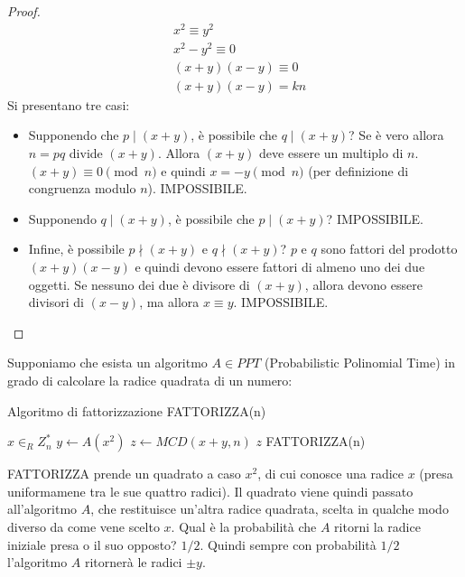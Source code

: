\begin{proof}
\begin{align*}
    &x^2 \equiv y^2\\
    &x^2 - y^2 \equiv 0\\
    &(x+y)(x-y) \equiv 0\\
    &(x+y)(x-y) = kn
\end{align*}
\noindent Si presentano tre casi:
\begin{itemize}
    \item Supponendo che $p \mid(x+y)$, è possibile che $q \mid(x+y)$? Se è vero allora $n = pq$ divide $(x+y)$. Allora $(x+y)$ deve essere un multiplo di $n$. $(x+y) \equiv 0 \pmod n$ e quindi $x = -y \pmod n$ (per definizione di congruenza modulo $n$). IMPOSSIBILE.

   \item Supponendo $q \mid(x+y)$, è possibile che $p \mid(x+y)$? IMPOSSIBILE.

   \item  Infine, è possibile $p \nmid(x+y)$ e $q \nmid(x+y)$? $p$ e $q$ sono fattori del prodotto $(x+y)(x-y)$ e quindi devono essere fattori di almeno uno dei due oggetti. Se nessuno dei due è divisore di $(x+y)$, allora devono essere divisori di $(x-y)$, ma allora $x \equiv y$. IMPOSSIBILE.
\end{itemize}
\end{proof}

\noindent Supponiamo che esista un algoritmo $A \in PPT$ (Probabilistic Polinomial Time) in grado di calcolare la radice quadrata di un numero:

\begin{algorithm}[H]
\caption{Algoritmo di fattorizzazione FATTORIZZA(n)}\label{alg:cap}
\begin{algorithmic}
\State $x \in_R Z_n^*$
\State $y \gets A(x^2)$
\State $z \gets MCD(x+y, n)$
    \State \Return $z$
\Else
    \State \Return FATTORIZZA(n)
\EndIf
\end{algorithmic}
\end{algorithm}

\noindent FATTORIZZA prende un quadrato a caso $x^2$, di cui conosce una radice $x$ (presa uniformamene tra le sue quattro radici). Il quadrato viene quindi passato all'algoritmo $A$, che restituisce un'altra radice quadrata, scelta in qualche modo diverso da come vene scelto $x$. Qual è la probabilità che $A$ ritorni la radice iniziale presa o il suo opposto? $1 / 2$. Quindi sempre con probabilità $1 / 2$ l'algoritmo $A$ ritornerà le radici $\pm y$. 

